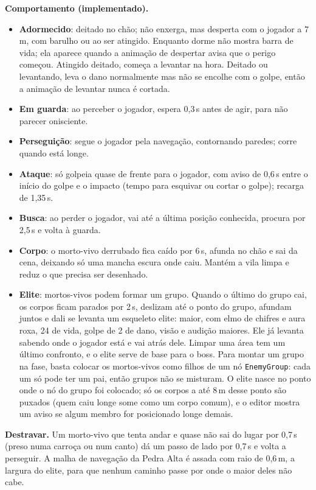 \documentclass[11pt,a4paper]{article}
\begin{document}
\textbf{Comportamento (implementado).}
\begin{itemize}
    \item \textbf{Adormecido}: deitado no chão; não enxerga, mas desperta com o jogador a 7\,m, com barulho ou ao ser atingido. Enquanto dorme não mostra barra de vida; ela aparece quando a animação de despertar avisa que o perigo começou. Atingido deitado, começa a levantar na hora. Deitado ou levantando, leva o dano normalmente mas não se encolhe com o golpe, então a animação de levantar nunca é cortada.
    \item \textbf{Em guarda}: ao perceber o jogador, espera 0,3\,s antes de agir, para não parecer onisciente.
    \item \textbf{Perseguição}: segue o jogador pela navegação, contornando paredes; corre quando está longe.
    \item \textbf{Ataque}: só golpeia quase de frente para o jogador, com aviso de 0,6\,s entre o início do golpe e o impacto (tempo para esquivar ou cortar o golpe); recarga de 1,35\,s.
    \item \textbf{Busca}: ao perder o jogador, vai até a última posição conhecida, procura por 2,5\,s e volta à guarda.
    \item \textbf{Corpo}: o morto-vivo derrubado fica caído por 6\,s, afunda no chão e sai da cena, deixando só uma mancha escura onde caiu. Mantém a vila limpa e reduz o que precisa ser desenhado.
    \item \textbf{Elite}: mortos-vivos podem formar um grupo. Quando o último do grupo cai, os corpos ficam parados por 2\,s, deslizam até o ponto do grupo, afundam juntos e dali se levanta um esqueleto elite: maior, com elmo de chifres e aura roxa, 24 de vida, golpe de 2 de dano, visão e audição maiores. Ele já levanta sabendo onde o jogador está e vai atrás dele. Limpar uma área tem um último confronto, e o elite serve de base para o boss. Para montar um grupo na fase, basta colocar os mortos-vivos como filhos de um nó \texttt{EnemyGroup}: cada um só pode ter um pai, então grupos não se misturam. O elite nasce no ponto onde o nó do grupo foi colocado; só os corpos a até 8\,m desse ponto são puxados (quem caiu longe some como um corpo comum), e o editor mostra um aviso se algum membro for posicionado longe demais.
\end{itemize}

\textbf{Destravar.} Um morto-vivo que tenta andar e quase não sai do lugar por 0,7\,s (preso numa carroça ou num canto) dá um passo de lado por 0,7\,s e volta a perseguir. A malha de navegação da Pedra Alta é assada com raio de 0,6\,m, a largura do elite, para que nenhum caminho passe por onde o maior deles não cabe.
\end{document}
